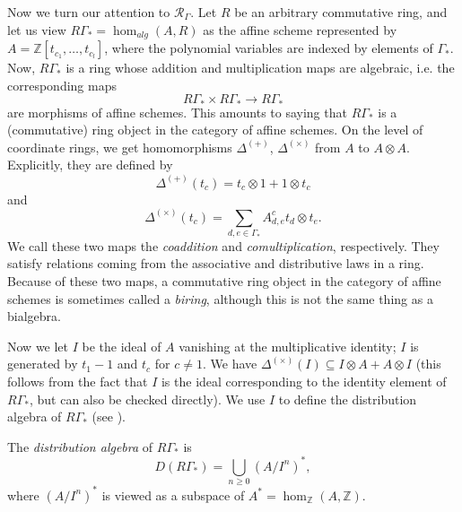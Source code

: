 \documentclass[ALCO,Unicode]{cedram}
\newcommand{\RGamma}{\mathcal{R}_{\Gamma}}
\newcommand{\RGamma}{\mathcal{R}_{\Gamma}}
\begin{document}
Now we turn our attention to $\RGamma$. Let $R$ be an arbitrary commutative ring, and let us view $R\Gamma_* = \hom_{alg}(A, R)$ as the affine scheme represented by $A = \mathbb{Z}[t_{c_1}, \ldots, t_{c_l}]$, where the polynomial variables are indexed by elements of $\Gamma_*$. Now, $R\Gamma_*$ is a ring whose addition and multiplication maps are algebraic, i.e. the corresponding maps
\[
R\Gamma_* \times R\Gamma_* \to R\Gamma_*
\]
are morphisms of affine schemes. This amounts to saying that $R\Gamma_*$ is a (commutative) ring object in the category of affine schemes. On the level of coordinate rings, we get homomorphisms $\Delta^{(+)}$, $\Delta^{(\times)}$ from $A$ to $A \otimes A$. Explicitly, they are defined by
\[
\Delta^{(+)}(t_c) = t_c \otimes 1 + 1 \otimes t_c
\]
and
\[
\Delta^{(\times)}(t_c) = \sum_{d,e \in \Gamma_*} A_{d,e}^c t_d \otimes t_e.
\]
We call these two maps the \emph{coaddition} and \emph{comultiplication}, respectively. They satisfy relations coming from the associative and distributive laws in a ring. Because of these two maps, a commutative ring object in the category of affine schemes is sometimes called a \emph{biring}, although this is not the same thing as a bialgebra.

Now we let $I$ be the ideal of $A$ vanishing at the multiplicative identity; $I$ is generated by $t_1-1$ and $t_c$ for $c \neq 1$. We have $\Delta^{(\times)}(I) \subseteq I \otimes A + A \otimes I$ (this follows from the fact that $I$ is the ideal corresponding to the identity element of $R\Gamma_*$, but can also be checked directly). We use $I$ to define the distribution algebra of $R\Gamma_*$ (see \cite[Chapter 7 of Part I]{Jantzen_alggp}).
\begin{definition}
The \emph{distribution algebra} of $R\Gamma_*$ is
\[
D(R\Gamma_*) = \bigcup_{n \geq 0} (A/I^n)^*,
\]
where $(A/I^n)^*$ is viewed as a subspace of $A^* = \hom_{\mathbb{Z}}(A, \mathbb{Z})$.
\end{definition}
\end{document}

